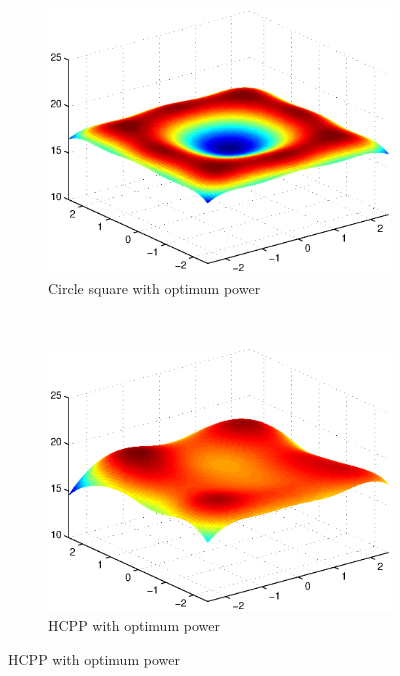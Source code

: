 \documentclass[slidestop,usepdftitle=false]{gvvslides}
\begin{document}
\begin{frame}
\begin{figure}[!]
\begin{subfigure}{0.3\columnwidth}
\includegraphics[width=\columnwidth]{c4_cirSq_SNR_opt}
\caption{Circle square with optimum power}
\end{subfigure}~
\begin{subfigure}{0.3\columnwidth}
\includegraphics[width=\columnwidth]{c4_hcpp_SNR_opt}
\caption{HCPP with optimum power}
\end{subfigure}
    
\label{fig:SNR_profiles}
\end{figure}
\end{frame}
\end{document}
